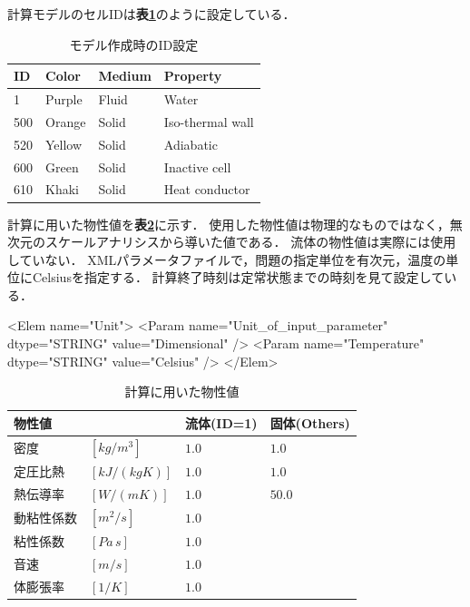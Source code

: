 計算モデルのセルIDは\textbf{表\ref{tbl:set voxel ID}}のように設定している．

\begin{table}[htdp]
\small
\caption{モデル作成時のID設定}
\begin{center}
\begin{tabular}{llll} \toprule
ID & Color & Medium & Property\\ \midrule
1 & Purple & Fluid & Water\\
500 & Orange & Solid & Iso-thermal wall\\
520 & Yellow & Solid & Adiabatic\\
600 & Green & Solid & Inactive cell\\
610 & Khaki & Solid & Heat conductor\\ \bottomrule
\end{tabular}
\end{center}
\label{tbl:set voxel ID}
\end{table}

計算に用いた物性値を\textbf{表\ref{tbl:shc1d medium_tbl}}に示す．
使用した物性値は物理的なものではなく，無次元のスケールアナリシスから導いた値である．
流体の物性値は実際には使用していない．
XMLパラメータファイルで，問題の指定単位を有次元，温度の単位にCelsiusを指定する．
計算終了時刻は定常状態までの時刻を見て設定している．

{\small
\begin{program}
<Elem name="Unit">
  <Param name="Unit_of_input_parameter" dtype="STRING" value="Dimensional" />
  <Param name="Temperature"             dtype="STRING" value="Celsius" />
</Elem>
\end{program}
}

\begin{table}[htdp]
\small
\caption{計算に用いた物性値}
\begin{center}
\begin{tabular}{llll}\\ \toprule
物性値 & & 流体(ID=1) & 固体(Others)\\ \midrule
密度 & $[kg/m^3]$ & $1.0$ & $1.0$\\
定圧比熱 & $[kJ/(kg K)]$ & $1.0$ & $1.0$\\
熱伝導率 & $[W/(m K)]$ & $1.0$ & $50.0$\\
動粘性係数 & $[m^2/s]$ & $1.0$ &\\
粘性係数 & $[Pa\,s]$ & $1.0$ &\\
音速 & $[m/s]$ & $1.0$ &\\
体膨張率 & $[1/K]$ & $1.0$ &\\ 
\bottomrule
\end{tabular}
\end{center}
\label{tbl:shc1d medium_tbl}
\end{table}


